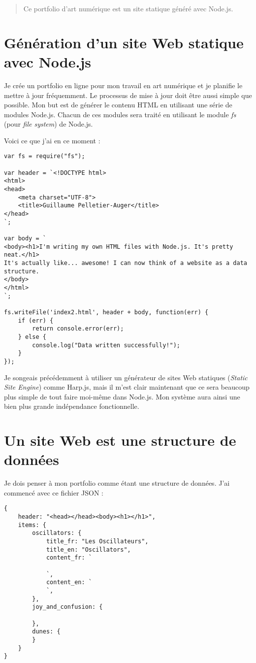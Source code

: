 
\begin{abstract}
Ce portfolio d'art numérique est un site statique généré avec Node.js.
\end{abstract}

\section{Génération d'un site Web statique avec Node.js}
Je crée un portfolio en ligne pour mon travail en art numérique et je planifie le mettre à jour fréquemment. Le processus de mise à jour doit être aussi simple que possible. Mon but est de générer le contenu HTML en utilisant une série de modules Node.js. Chacun de ces modules sera traité en utilisant le module \textit{fs} (pour \textit{file system}) de Node.js.

Voici ce que j'ai en ce moment :

\begin{lstlisting}
var fs = require("fs");

var header = `<!DOCTYPE html>
<html>
<head>
    <meta charset="UTF-8">
    <title>Guillaume Pelletier-Auger</title>
</head>
`;

var body = `
<body><h1>I'm writing my own HTML files with Node.js. It's pretty neat.</h1>
It's actually like... awesome! I can now think of a website as a data structure.
</body>
</html>
`;

fs.writeFile('index2.html', header + body, function(err) {
    if (err) {
        return console.error(err);
    } else {
        console.log("Data written successfully!");
    }
});

\end{lstlisting}

Je songeais précédemment à utiliser un générateur de sites Web statiques (\textit{Static Site Engine}) comme Harp.js, mais il m'est clair maintenant que ce sera beaucoup plus simple de tout faire moi-même dans Node.js. Mon système aura ainsi une bien plus grande indépendance fonctionnelle.

\section{Un site Web est une structure de données}
Je dois penser à mon portfolio comme étant une structure de données.
J'ai commencé avec ce fichier JSON :
\begin{lstlisting}
{
    header: "<head></head><body><h1></h1>",
    items: {
        oscillators: {
            title_fr: "Les Oscillateurs",
            title_en: "Oscillators",
            content_fr: `
            
            `,
            content_en: `
            `,
        },
        joy_and_confusion: {

        },
        dunes: {
        }
    }
}
\end{lstlisting}

